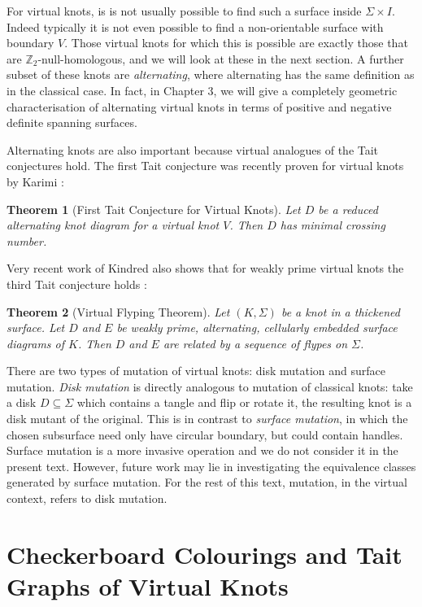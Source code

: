 \documentclass[12pt]{report}
\newcommand{\Z}{\mathbb{Z}}
\newtheorem*{theorem}{Theorem}
\theoremstyle{upright}
\begin{document}
For virtual knots, is is not usually possible to find such a surface inside $\Sigma \times I$. Indeed typically it is not even possible to find a non-orientable surface with boundary $V$. Those virtual knots for which this is possible are exactly those that are $\Z_{2}$-null-homologous, and we will look at these in the next section. A further subset of these knots are \textit{alternating}, where alternating has the same definition as in the classical case. In fact, in Chapter $3$, we will give a completely geometric characterisation of alternating virtual knots in terms of positive and negative definite spanning surfaces.

Alternating knots are also important because virtual analogues of the Tait conjectures hold. The first Tait conjecture was recently proven for virtual knots by Karimi \cite[Theorem 1.6]{alternating-virtual-knots}:

\begin{theorem}[First Tait Conjecture for Virtual Knots]
Let $D$ be a reduced alternating knot diagram for a virtual knot $V$. Then $D$ has minimal crossing number.
\end{theorem}

Very recent work of Kindred also shows that for weakly prime virtual knots the third Tait conjecture holds \cite[Theorem 4.18]{virtual-flyping-theorem}:

\begin{theorem}[Virtual Flyping Theorem]
Let $(K, \Sigma)$ be a knot in a thickened surface. Let $D$ and $E$ be weakly prime, alternating, cellularly embedded surface diagrams of $K$. Then $D$ and $E$ are related by a sequence of flypes on $\Sigma$.
\end{theorem}

There are two types of mutation of virtual knots: disk mutation and surface mutation. \textit{Disk mutation} is directly analogous to mutation of classical knots: take a disk $D \subseteq \Sigma$ which contains a tangle and flip or rotate it, the resulting knot is a disk mutant of the original. This is in contrast to \textit{surface mutation}, in which the chosen subsurface need only have circular boundary, but could contain handles. Surface mutation is a more invasive operation and we do not consider it in the present text. However, future work may lie in investigating the equivalence classes generated by surface mutation. For the rest of this text, mutation, in the virtual context, refers to disk mutation.

\section{Checkerboard Colourings and Tait Graphs of Virtual Knots}
\end{document}
